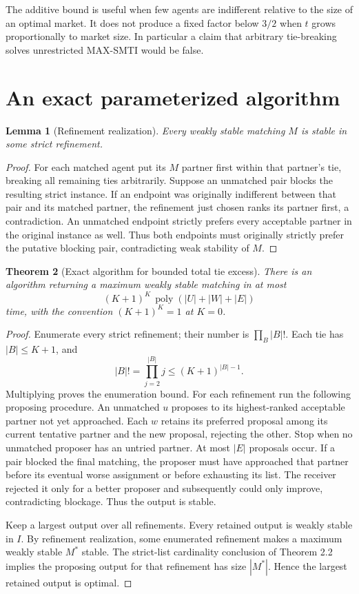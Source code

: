 \documentclass[11pt,a4paper]{article}
\newtheorem{theorem}{Theorem}[section]
\newtheorem{lemma}[theorem]{Lemma}
\theoremstyle{remark}
\begin{document}
The additive bound is useful when few agents are indifferent relative to the size of an optimal market. It does not produce a fixed factor below $3/2$ when $t$ grows proportionally to market size. In particular a claim that arbitrary tie-breaking solves unrestricted MAX-SMTI would be false.

\section{An exact parameterized algorithm}
\begin{lemma}[Refinement realization]
Every weakly stable matching $M$ is stable in some strict refinement.
\end{lemma}
\begin{proof}
For each matched agent put its $M$ partner first within that partner's tie, breaking all remaining ties arbitrarily. Suppose an unmatched pair blocks the resulting strict instance. If an endpoint was originally indifferent between that pair and its matched partner, the refinement just chosen ranks its partner first, a contradiction. An unmatched endpoint strictly prefers every acceptable partner in the original instance as well. Thus both endpoints must originally strictly prefer the putative blocking pair, contradicting weak stability of $M$.
\end{proof}

\begin{theorem}[Exact algorithm for bounded total tie excess]
There is an algorithm returning a maximum weakly stable matching in at most
\[
 (K+1)^K\,\operatorname{poly}(|U|+|W|+|E|)
\]
time, with the convention $(K+1)^K=1$ at $K=0$.
\end{theorem}
\begin{proof}
Enumerate every strict refinement; their number is $\prod_B|B|!$. Each tie has $|B|\le K+1$, and
\[
 |B|!=\prod_{j=2}^{|B|}j\le(K+1)^{|B|-1}.
\]
Multiplying proves the enumeration bound. For each refinement run the following proposing procedure. An unmatched $u$ proposes to its highest-ranked acceptable partner not yet approached. Each $w$ retains its preferred proposal among its current tentative partner and the new proposal, rejecting the other. Stop when no unmatched proposer has an untried partner. At most $|E|$ proposals occur. If a pair blocked the final matching, the proposer must have approached that partner before its eventual worse assignment or before exhausting its list. The receiver rejected it only for a better proposer and subsequently could only improve, contradicting blockage. Thus the output is stable.

Keep a largest output over all refinements. Every retained output is weakly stable in $I$. By refinement realization, some enumerated refinement makes a maximum weakly stable $M^*$ stable. The strict-list cardinality conclusion of Theorem 2.2 implies the proposing output for that refinement has size $|M^*|$. Hence the largest retained output is optimal.
\end{proof}
\end{document}
